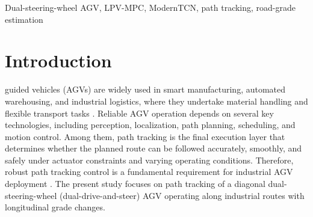 \documentclass{ieeeaccess}
\newcommand{\citep}[1]{\cite{#1}}
\begin{document}
\begin{keywords}

Dual-steering-wheel AGV, LPV-MPC, ModernTCN, path tracking, road-grade estimation

\end{keywords}

\titlepgskip=-21pt
\maketitle

\section{Introduction}

 guided vehicles (AGVs) are widely used in smart manufacturing, automated warehousing, and industrial logistics, where they undertake material handling and flexible transport tasks \citep{Zhang2023AGVSurvey,Oyekanlu2020AGVReview,Bhargava2024AGVReview}. Reliable AGV operation depends on several key technologies, including perception, localization, path planning, scheduling, and motion control. Among them, path tracking is the final execution layer that determines whether the planned route can be followed accurately, smoothly, and safely under actuator constraints and varying operating conditions. Therefore, robust path tracking control is a fundamental requirement for industrial AGV deployment \citep{DeRyck2020AGVControlReview}. The present study focuses on path tracking of a diagonal dual-steering-wheel (dual-drive-and-steer) AGV operating along industrial routes with longitudinal grade changes.
\end{document}
